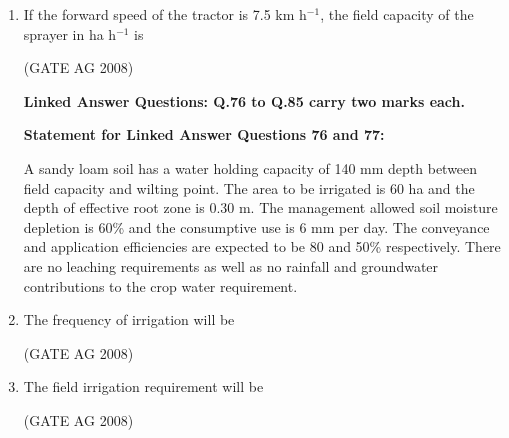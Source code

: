 \documentclass[journal,12pt,onecolumn]{IEEEtran}
\begin{document}
\begin{enumerate}
\medskip

\item 
 If the forward speed of the tractor is 7.5 km h$^{-1}$, the field capacity of the sprayer in ha h$^{-1}$ is
\begin{enumerate}
\end{enumerate}
\hfill(GATE AG 2008)\\

\medskip


\textbf{Linked Answer Questions: Q.76 to Q.85 carry two marks each.}

\textbf{Statement for Linked Answer Questions 76 and 77:}

A sandy loam soil has a water holding capacity of 140 mm depth between field capacity and wilting point. The area to be irrigated is 60 ha and the depth of effective root zone is 0.30 m. The management allowed soil moisture depletion is 60\% and the consumptive use is 6 mm per day. The conveyance and application efficiencies are expected to be 80 and 50\% respectively. There are no leaching requirements as well as no rainfall and groundwater contributions to the crop water requirement.

\item 
 The frequency of irrigation will be
\begin{enumerate}
\end{enumerate}
\hfill(GATE AG 2008)\\

\medskip

\item 
 The field irrigation requirement will be
\begin{enumerate}
\end{enumerate}
\hfill(GATE AG 2008)\\


\end{enumerate}
\end{document}
